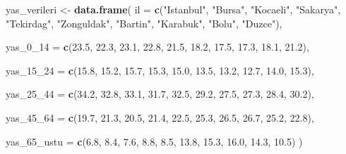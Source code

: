 \documentclass[
]{article}
\newenvironment{Shaded}{\begin{snugshade}}{\end{snugshade}}
\newcommand{\AttributeTok}[1]{\textcolor[rgb]{0.13,0.29,0.53}{#1}}
\newcommand{\FloatTok}[1]{\textcolor[rgb]{0.00,0.00,0.81}{#1}}
\newcommand{\FunctionTok}[1]{\textcolor[rgb]{0.13,0.29,0.53}{\textbf{#1}}}
\newcommand{\NormalTok}[1]{#1}
\newcommand{\OtherTok}[1]{\textcolor[rgb]{0.56,0.35,0.01}{#1}}
\newcommand{\StringTok}[1]{\textcolor[rgb]{0.31,0.60,0.02}{#1}}
\begin{document}
\begin{Shaded}
\begin{Highlighting}[]
\NormalTok{yas\_verileri }\OtherTok{\textless{}{-}} \FunctionTok{data.frame}\NormalTok{(}
  \AttributeTok{il =} \FunctionTok{c}\NormalTok{(}\StringTok{"Istanbul"}\NormalTok{, }\StringTok{"Bursa"}\NormalTok{, }\StringTok{"Kocaeli"}\NormalTok{, }\StringTok{"Sakarya"}\NormalTok{, }\StringTok{"Tekirdag"}\NormalTok{, }
         \StringTok{"Zonguldak"}\NormalTok{, }\StringTok{"Bartin"}\NormalTok{, }\StringTok{"Karabuk"}\NormalTok{, }\StringTok{"Bolu"}\NormalTok{, }\StringTok{"Duzce"}\NormalTok{),}
  
  \AttributeTok{yas\_0\_14 =} \FunctionTok{c}\NormalTok{(}\FloatTok{23.5}\NormalTok{, }\FloatTok{22.3}\NormalTok{, }\FloatTok{23.1}\NormalTok{, }\FloatTok{22.8}\NormalTok{, }\FloatTok{21.5}\NormalTok{,}
               \FloatTok{18.2}\NormalTok{, }\FloatTok{17.5}\NormalTok{, }\FloatTok{17.3}\NormalTok{, }\FloatTok{18.1}\NormalTok{, }\FloatTok{21.2}\NormalTok{),}
  
  \AttributeTok{yas\_15\_24 =} \FunctionTok{c}\NormalTok{(}\FloatTok{15.8}\NormalTok{, }\FloatTok{15.2}\NormalTok{, }\FloatTok{15.7}\NormalTok{, }\FloatTok{15.3}\NormalTok{, }\FloatTok{15.0}\NormalTok{,}
                \FloatTok{13.5}\NormalTok{, }\FloatTok{13.2}\NormalTok{, }\FloatTok{12.7}\NormalTok{, }\FloatTok{14.0}\NormalTok{, }\FloatTok{15.3}\NormalTok{),}
  
  \AttributeTok{yas\_25\_44 =} \FunctionTok{c}\NormalTok{(}\FloatTok{34.2}\NormalTok{, }\FloatTok{32.8}\NormalTok{, }\FloatTok{33.1}\NormalTok{, }\FloatTok{31.7}\NormalTok{, }\FloatTok{32.5}\NormalTok{,}
                \FloatTok{29.2}\NormalTok{, }\FloatTok{27.5}\NormalTok{, }\FloatTok{27.3}\NormalTok{, }\FloatTok{28.4}\NormalTok{, }\FloatTok{30.2}\NormalTok{),}
  
  \AttributeTok{yas\_45\_64 =} \FunctionTok{c}\NormalTok{(}\FloatTok{19.7}\NormalTok{, }\FloatTok{21.3}\NormalTok{, }\FloatTok{20.5}\NormalTok{, }\FloatTok{21.4}\NormalTok{, }\FloatTok{22.5}\NormalTok{,}
                \FloatTok{25.3}\NormalTok{, }\FloatTok{26.5}\NormalTok{, }\FloatTok{26.7}\NormalTok{, }\FloatTok{25.2}\NormalTok{, }\FloatTok{22.8}\NormalTok{),}
  
  \AttributeTok{yas\_65\_ustu =} \FunctionTok{c}\NormalTok{(}\FloatTok{6.8}\NormalTok{, }\FloatTok{8.4}\NormalTok{, }\FloatTok{7.6}\NormalTok{, }\FloatTok{8.8}\NormalTok{, }\FloatTok{8.5}\NormalTok{,}
                  \FloatTok{13.8}\NormalTok{, }\FloatTok{15.3}\NormalTok{, }\FloatTok{16.0}\NormalTok{, }\FloatTok{14.3}\NormalTok{, }\FloatTok{10.5}\NormalTok{)}
\NormalTok{)}


\end{Highlighting}
\end{Shaded}
\end{document}
